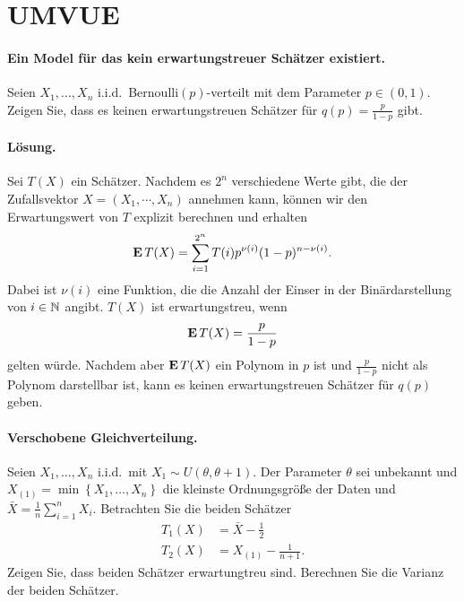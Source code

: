 \section{UMVUE}

\paragraph{Ein Model für das kein erwartungstreuer Schätzer existiert.}
Seien $X_1,\ldots,X_n$ i.i.d.\ Bernoulli$(p)$-verteilt mit dem Parameter $p \in
(0,1)$.  Zeigen Sie, dass es keinen erwartungstreuen Schätzer für $q(p) =
\frac{p}{1-p}$ gibt. 

\paragraph*{Lösung.} Sei $T(X)$ ein Schätzer. Nachdem es $2^n$ verschiedene
Werte gibt, die der Zufallsvektor $X = (X_1, \cdots, X_n)$ annehmen kann, können 
wir den Erwartungswert von $T$ explizit berechnen und erhalten
\begin{equation*}
    \mathbf{E} \, T(X) = \sum_{i = 1}^{2^n} T(i) p^{\nu(i)}(1-p)^{n - \nu(i)}.
\end{equation*}
Dabei ist $\nu(i)$ eine Funktion, die die Anzahl der Einser in der
Binärdarstellung von $i\in \mathbb N$ angibt. $T(X)$ ist erwartungstreu, wenn 
\begin{equation*}
    \mathbf{E} \, T(X) = \frac{p}{1-p}
\end{equation*}
gelten würde. Nachdem aber $\mathbf{E}\, T(X)$ ein Polynom in $p$ ist und $\frac{p}{1-p}$ nicht
als Polynom darstellbar ist, kann es keinen erwartungstreuen Schätzer für $q(p)$ geben. 


\paragraph{Verschobene Gleichverteilung. } 
Seien $X_1,\ldots,X_n$ i.i.d.\ mit $X_1\sim U(\theta,\theta+1)$. Der Parameter
$\theta$ sei  unbekannt und $X_{(1)}=\min\left\{ X_1,\ldots,X_n \right\}$ die
kleinste Ordnungsgröße der Daten und $\bar X= \frac{1}{n}\sum_{i=1}^{n}X_i$.
Betrachten Sie die beiden Schätzer 
\begin{align*}
	T_1(X) &= \bar X - \frac{1}{2} \\
	T_2(X) &=  X_{(1)} - \frac{1}{n+1}.
\end{align*}
Zeigen Sie, dass beiden Schätzer erwartungtreu sind. Berechnen Sie 
die Varianz der beiden Schätzer.

